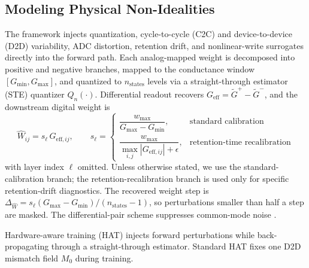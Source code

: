 \subsection{Modeling Physical Non-Idealities}
\label{subsec:modeling-nonidealities}

The framework injects quantization, cycle-to-cycle (C2C) and device-to-device (D2D) variability, ADC distortion, retention drift, and nonlinear-write surrogates directly into the forward path. Each analog-mapped weight is decomposed into positive and negative branches, mapped to the conductance window $[G_{\min}, G_{\max}]$, and quantized to $n_{\mathrm{states}}$ levels via a straight-through estimator (STE) quantizer $Q_{n}(\cdot)$. Differential readout recovers $G_{\mathrm{eff}}=\tilde{G}^{+}-\tilde{G}^{-}$, and the downstream digital weight is
\begin{equation}
    \hat{W}_{ij}=s_{\ell}\,G_{\mathrm{eff},ij},
    \qquad
    s_{\ell}=
    \begin{cases}
        \dfrac{w_{\max}}{G_{\max}-G_{\min}}, & \text{standard calibration} \\[6pt]
        \dfrac{w_{\max}}{\max_{i,j}|G_{\mathrm{eff},ij}|+\epsilon}, & \text{retention-time recalibration}
    \end{cases}
\label{eq:scale-recovery}
\end{equation}
with layer index $\ell$ omitted. Unless otherwise stated, we use the standard-calibration branch; the retention-recalibration branch is used only for specific retention-drift diagnostics. The recovered weight step is $\Delta_{\hat{W}}=s_{\ell}(G_{\max}-G_{\min})/(n_{\mathrm{states}}-1)$, so perturbations smaller than half a step are masked. The differential-pair scheme suppresses common-mode noise \citep{wei2020voltagedifferential,kim2024sttmram}.

Hardware-aware training (HAT) injects forward perturbations while back-propagating through a straight-through estimator. Standard HAT fixes one D2D mismatch field $M_{0}$ during training.
